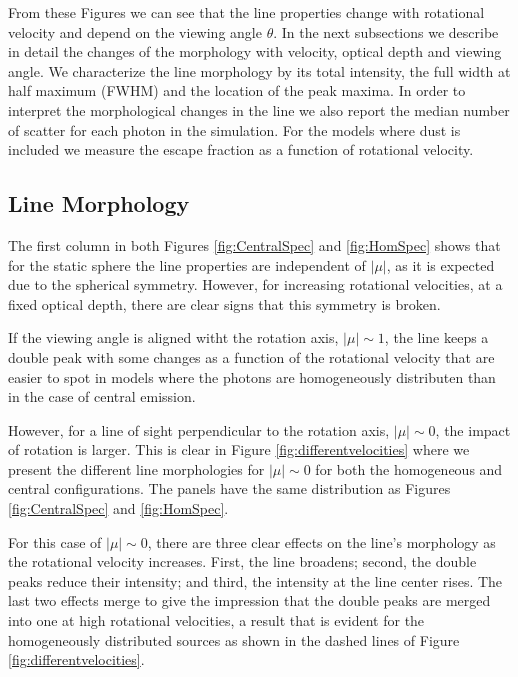 \documentclass{emulateapj}
\newcommand{\ly}{{\ifmmode{{\rm Ly}\alpha~}\else{Ly$\alpha$~}\fi}}
\begin{document}
From these Figures we can see that the line properties change with
rotational velocity and depend on the viewing angle $\theta$.  In the
next subsections we describe in  detail the changes of the morphology
with velocity, optical depth and viewing angle. We characterize the
line morphology by its total intensity, the full width at half maximum
(FWHM) and the location of the peak maxima. In order to interpret the
morphological changes in the line we also report the median number of
scatter for each \ly photon in the simulation. For the models where
dust is included we measure the escape fraction as a function of
rotational velocity.  

\subsection{Line Morphology}
\label{sec:angles}

The first column in both Figures \ref{fig:CentralSpec} and
\ref{fig:HomSpec} shows that for the static sphere the line properties
are independent of $|\mu|$, as it is expected due
to the spherical symmetry. However, for increasing rotational
velocities, at a fixed optical depth, there are clear signs that this
symmetry is broken. 

If the viewing angle is aligned witht the rotation axis, $|\mu|\sim
1$, the \ly line keeps a double peak with some changes as a function
of the rotational velocity that are easier to spot in models where the
\ly photons are homogeneously distributen than in the case of central
emission. 

However, for a line of sight perpendicular to the rotation
axis, $|\mu|\sim 0$, the impact of rotation is larger.  This is clear
in  Figure \ref{fig:differentvelocities} where we present the
different line morphologies for $|\mu|\sim 0$ for both the homogeneous
and central configurations. The panels have the same distribution as
Figures \ref{fig:CentralSpec} and \ref{fig:HomSpec}.  

For this case of $|\mu|\sim 0$, there are three clear effects on the
line's morphology as the rotational velocity increases. First, the
line broadens; second, the double peaks reduce their intensity; and
third, the intensity at the line center rises. The last two effects
merge to give the impression that the double peaks are merged into one
at high rotational velocities, a result that is evident for the
homogeneously distributed sources as shown in the dashed lines of
Figure \ref{fig:differentvelocities}. 
\end{document}
